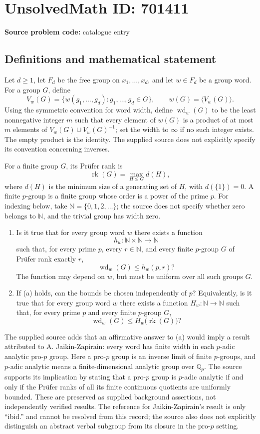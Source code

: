 \documentclass[11pt]{article}
\begin{document}
\section*{UnsolvedMath ID: 701411}
\textbf{Source problem code:} catalogue entry
\subsection{Definitions and mathematical statement}
Let \(d\geq 1\), let \(F_d\) be the free group on \(x_1,\ldots,x_d\), and let \(w\in F_d\) be a group word. For a group \(G\), define
\[
V_w(G)=\{w(g_1,\ldots,g_d):g_1,\ldots,g_d\in G\},
\qquad w(G)=\langle V_w(G)\rangle.
\]
Using the symmetric convention for word width, define \(\operatorname{wd}_w(G)\) to be the least nonnegative integer \(m\) such that every element of \(w(G)\) is a product of at most \(m\) elements of \(V_w(G)\cup V_w(G)^{-1}\); set the width to \(\infty\) if no such integer exists. The empty product is the identity. The supplied source does not explicitly specify its convention concerning inverses.

For a finite group \(G\), its Pr\"ufer rank is
\[
\operatorname{rk}(G)=\max_{H\leq G}d(H),
\]
where \(d(H)\) is the minimum size of a generating set of \(H\), with \(d(\{1\})=0\). A finite \(p\)-group is a finite group whose order is a power of the prime \(p\). For indexing below, take \(\mathbb N=\{0,1,2,\ldots\}\); the source does not specify whether zero belongs to \(\mathbb N\), and the trivial group has width zero.

\begin{enumerate}
\item[(a)] Is it true that for every group word \(w\) there exists a function
\[
h_w:\mathbb N\times\mathbb N\longrightarrow\mathbb N
\]
such that, for every prime \(p\), every \(r\in\mathbb N\), and every finite \(p\)-group \(G\) of Pr\"ufer rank exactly \(r\),
\[
\operatorname{wd}_w(G)\leq h_w(p,r)?
\]
The function may depend on \(w\), but must be uniform over all such groups \(G\).
\item[(b)] If (a) holds, can the bounds be chosen independently of \(p\)? Equivalently, is it true that for every group word \(w\) there exists a function \(H_w:\mathbb N\to\mathbb N\) such that, for every prime \(p\) and every finite \(p\)-group \(G\),
\[
\operatorname{wd}_w(G)\leq H_w\bigl(\operatorname{rk}(G)\bigr)?
\]
\end{enumerate}

The supplied source adds that an affirmative answer to (a) would imply a result attributed to A. Jaikin-Zapirain: every word has finite width in each \(p\)-adic analytic pro-\(p\) group. Here a pro-\(p\) group is an inverse limit of finite \(p\)-groups, and \(p\)-adic analytic means a finite-dimensional analytic group over \(\mathbb Q_p\). The source supports its implication by stating that a pro-\(p\) group is \(p\)-adic analytic if and only if the Pr\"ufer ranks of all its finite continuous quotients are uniformly bounded. These are preserved as supplied background assertions, not independently verified results. The reference for Jaikin-Zapirain's result is only ``ibid.'' and cannot be resolved from this record; the source also does not explicitly distinguish an abstract verbal subgroup from its closure in the pro-\(p\) setting.
\end{document}
